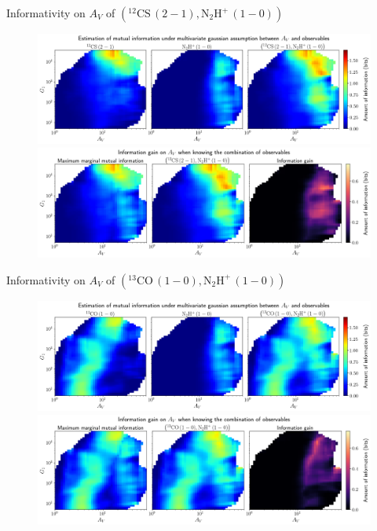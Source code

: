 \documentclass{beamer}
\begin{document}
\begin{frame}{Informativity on $A_V$ of $\left(\mathrm{^{12}CS\,(2-1)},\mathrm{N_2H^+\,(1-0)}\right)$}
    \begin{figure}
        \centering
        \includegraphics[width=0.95\linewidth]{../linearinfo/av__12cs21_n2hp10_linearinfo.png}
        \vfill
        \includegraphics[width=0.95\linewidth]{../linearinfo/av__12cs21_n2hp10_linearinfo_gain.png}
    \end{figure}
\end{frame}

\begin{frame}{Informativity on $A_V$ of $\left(\mathrm{^{13}CO\,(1-0)},\mathrm{N_2H^+\,(1-0)}\right)$}
    \begin{figure}
        \centering
        \includegraphics[width=0.95\linewidth]{../linearinfo/av__13co10_n2hp10_linearinfo.png}
        \vfill
        \includegraphics[width=0.95\linewidth]{../linearinfo/av__13co10_n2hp10_linearinfo_gain.png}
    \end{figure}
\end{frame}
\end{document}
